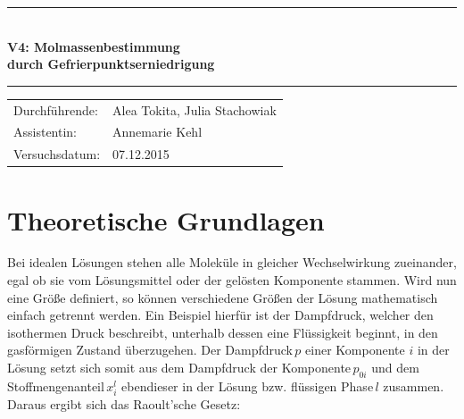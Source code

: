 \documentclass[12pt,a4paper,titlepage,headinclude,bibtotoc]{scrartcl}
\begin{document}
\begin{titlepage}
\centering

\vspace*{3cm}

\rule{\textwidth}{1pt}\\[0.5cm]
{\huge \bfseries
  V4: Molmassenbestimmung\\[1.5ex]
  durch Gefrierpunktserniedrigung}\\[0.5cm]
\rule{\textwidth}{1pt}

\vspace*{3cm}


\begin{Large}
\begin{tabular}{ll}
Durchführende: &  Alea Tokita, Julia Stachowiak\\
Assistentin: & Annemarie Kehl\\
 Versuchsdatum: & 07.12.2015\\
\end{tabular}
\end{Large}

\vspace*{2.5cm}

\begin{Large}
\end{Large}

\end{titlepage}

\tableofcontents

\newpage

\section{Theoretische Grundlagen}

Bei idealen Lösungen stehen alle Moleküle in gleicher Wechselwirkung zueinander, egal ob sie vom Lösungsmittel oder der gelösten Komponente stammen. 
Wird nun eine Größe definiert, so können verschiedene Größen der Lösung mathematisch einfach getrennt werden. Ein Beispiel hierfür ist der Dampfdruck, welcher den isothermen Druck beschreibt, unterhalb dessen eine Flüssigkeit beginnt, in den gasförmigen Zustand überzugehen.
Der Dampfdruck\,$p$ einer Komponente $i$ in der Lösung setzt sich somit aus dem Dampfdruck der Komponente\,$p_{0i}$ und dem Stoffmengenanteil\,$x_i^l$ ebendieser in der Lösung bzw. flüssigen Phase\,$l$ zusammen.
Daraus ergibt sich das Raoult'sche Gesetz:\\
\end{document}
